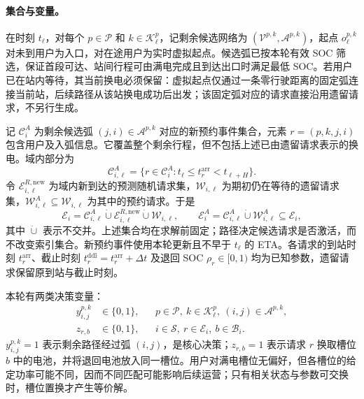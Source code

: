 \documentclass[12pt,a4paper,UTF8]{ctexart}
\begin{document}
\paragraph{集合与变量。}
在时刻 $t_\ell$，对每个 $p\in\mathcal P$ 和 $k\in\mathcal K_\ell^p$，记剩余候选网络为 $(\mathcal V^{p,k},\mathcal A^{p,k})$，起点 $o_\ell^{p,k}$ 对未到用户为入口，对在途用户为实时虚拟起点。候选弧已按本轮有效 SOC 筛选，保证首段可达、站间行程可由满电完成且到达出口时满足最低 SOC。若用户已在站内等待，其当前换电必须保留：虚拟起点仅通过一条零行驶距离的固定弧连接当前站，后续路径从该站换电成功后出发；该固定弧对应的请求直接沿用遗留请求，不另行生成。

记 $\mathcal C_i^A$ 为剩余候选弧 $(j,i)\in\mathcal A^{p,k}$ 对应的新预约事件集合，元素 $r=(p,k,j,i)$ 包含用户及入弧信息。它覆盖整个剩余行程，但不包括上述已由遗留请求表示的换电。域内部分为
\[
\mathcal C_{i,\ell}^A
=\{r\in\mathcal C_i^A:t_\ell\le t_r^{\mathrm{arr}}<t_{\ell+H}\}.
\]
令 $\mathcal E_{i,\ell}^{R,\mathrm{new}}$ 为域内新到达的预测随机请求集，$\mathcal W_{i,\ell}$ 为期初仍在等待的遗留请求集，$\mathcal W_{i,\ell}^A\subseteq\mathcal W_{i,\ell}$ 为其中的预约请求。于是
\begin{equation}
\mathcal E_i=\mathcal C_{i,\ell}^A\mathbin{\dot\cup}\mathcal E_{i,\ell}^{R,\mathrm{new}}\mathbin{\dot\cup}\mathcal W_{i,\ell},
\qquad
\mathcal E_i^A=\mathcal C_{i,\ell}^A\mathbin{\dot\cup}\mathcal W_{i,\ell}^A
\subseteq\mathcal E_i,
\label{eq:request_sets}
\end{equation}
其中 $\dot\cup$ 表示不交并。上述集合均在求解前固定；路径决定候选请求是否激活，而不改变索引集合。新预约事件使用本轮更新且不早于 $t_\ell$ 的 ETA。各请求的到站时刻 $t_r^{\mathrm{arr}}$、截止时刻 $t_r^{\mathrm{ddl}}=t_r^{\mathrm{arr}}+\Delta t$ 及退回 SOC $\rho_r\in[0,1)$ 均为已知参数，遗留请求保留原到站与截止时刻。

本轮有两类决策变量：
\begin{equation}
\begin{aligned}
y_{i,j}^{p,k}&\in\{0,1\},
&&p\in\mathcal P,\ k\in\mathcal K_\ell^p,\ (i,j)\in\mathcal A^{p,k},\\
z_{r,b}&\in\{0,1\},
&&i\in\mathcal S,\ r\in\mathcal E_i,\ b\in\mathcal B_i.
\end{aligned}
\label{eq:decision_variables}
\end{equation}
$y_{i,j}^{p,k}=1$ 表示剩余路径经过弧 $(i,j)$，是核心决策；$z_{r,b}=1$ 表示请求 $r$ 换取槽位 $b$ 中的电池，并将退回电池放入同一槽位。用户对满电槽位无偏好，但各槽位的给定功率可能不同，因而不同匹配可能影响后续运营；只有相关状态与参数可交换时，槽位置换才产生等价解。
\end{document}
